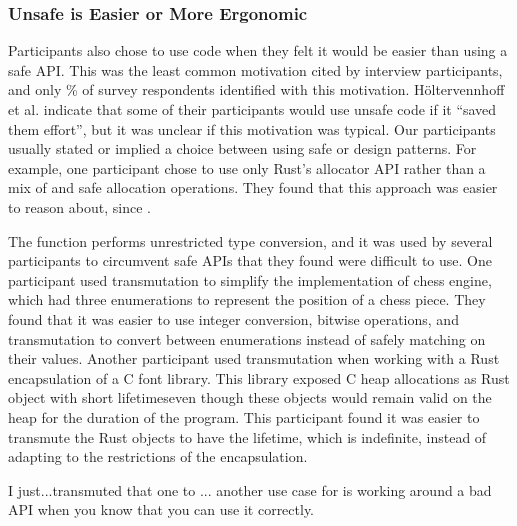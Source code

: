 \subsubsection{Unsafe is Easier or More Ergonomic}
Participants also chose to use \unsafe code when they felt it would be easier than using a safe API. This was the least common motivation cited by interview participants, and only \%  of survey respondents identified with this motivation. Höltervennhoff et al.\cite{holtervennhoff23} indicate that some of their participants would use unsafe code if it ``saved them effort'', but it was unclear if this motivation was typical. Our participants usually stated or implied a choice between using safe or \unsafe design patterns. For example, one participant chose to use only Rust's \unsafe allocator API rather than a mix of \unsafe and safe allocation operations. They found that this approach was easier to reason about, since .

The \unsafe function  performs unrestricted type conversion, and it was used by several participants to circumvent safe APIs that they found were difficult to use. One participant used transmutation to simplify the implementation of chess engine, which had three enumerations to represent the position of a chess piece. They found that it was easier to use integer conversion, bitwise operations, and transmutation to convert between enumerations instead of safely matching on their values. Another participant used transmutation when working with a Rust encapsulation of a C font library. This library exposed C heap allocations as Rust object with short lifetimes\textemdash even though these objects would remain valid on the heap for the duration of the program. This participant found it was easier to transmute the Rust objects to have the  lifetime, which is indefinite, instead of adapting to the restrictions of the encapsulation. 
\begin{pquote}{14}
I just...transmuted that one to {\normalfont {}}...
another use case for {\normalfont \unsafe} is working around a bad API when you know that you can use it correctly.
\end{pquote}


